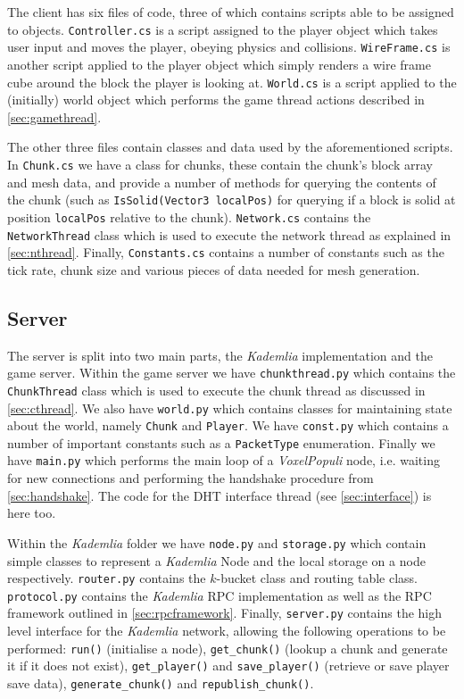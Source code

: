 \documentclass[12pt,notitlepage,a4paper]{report}
\newcommand{\kademlia}{\emph{Kademlia}}
\newcommand{\K}{$k$}
\newcommand{\voxpop}{\emph{VoxelPopuli}}
\begin{document}
	The client has six files of code, three of which contains scripts able to be assigned to objects. {\tt Controller.cs} is a script assigned to the player object which takes user input and moves the player, obeying physics and collisions. {\tt WireFrame.cs} is another script applied to the player object which simply renders a wire frame cube around the block the player is looking at. {\tt World.cs} is a script applied to the (initially) world object which performs the game thread actions described in \cref{sec:gamethread}.
	
	The other three files contain classes and data used by the aforementioned scripts. In {\tt Chunk.cs} we have a class for chunks, these contain the chunk's block array and mesh data, and provide a number of methods for querying the contents of the chunk (such as {\tt IsSolid(Vector3 localPos)} for querying if a block is solid at position {\tt localPos} relative to the chunk). {\tt Network.cs} contains the {\tt NetworkThread} class which is used to execute the network thread as explained in \cref{sec:nthread}. Finally, {\tt Constants.cs} contains a number of constants such as the tick rate, chunk size and various pieces of data needed for mesh generation.
	
	\subsection{Server}
	The server is split into two main parts, the \kademlia{} implementation and the game server. Within the game server we have {\tt chunkthread.py} which contains the {\tt ChunkThread} class which is used to execute the chunk thread as discussed in \cref{sec:cthread}. We also have {\tt world.py} which contains classes for maintaining state about the world, namely {\tt Chunk} and {\tt Player}. We have {\tt const.py} which contains a number of important constants such as a {\tt PacketType} enumeration. Finally we have {\tt main.py} which performs the main loop of a \voxpop{} node, i.e. waiting for new connections and performing the handshake procedure from \cref{sec:handshake}. The code for the DHT interface thread (see \cref{sec:interface}) is here too.
	
	Within the \kademlia{} folder we have {\tt node.py} and {\tt storage.py} which contain simple classes to represent a \kademlia{} Node and the local storage on a node respectively. {\tt router.py} contains the \K-bucket class and routing table class. {\tt protocol.py} contains the \kademlia{} RPC implementation as well as the RPC framework outlined in \cref{sec:rpcframework}. Finally, {\tt server.py} contains the high level interface for the \kademlia{} network, allowing the following operations to be performed: {\tt run()} (initialise a node), {\tt get\_chunk()} (lookup a chunk and generate it if it does not exist), {\tt get\_player()} and {\tt save\_player()} (retrieve or save player save data), {\tt generate\_chunk()} and {\tt republish\_chunk()}.
	
\end{document}
